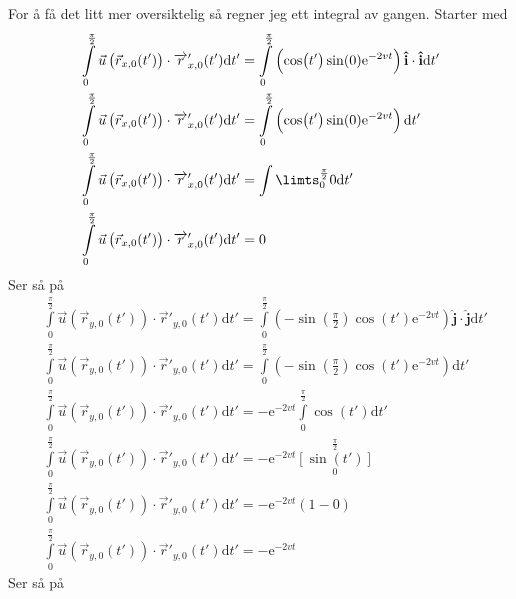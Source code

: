 \documentclass[a4paper,10pt,norsk]{article}
\newcommand{\dd}[1]{\mathrm{d}#1}
\newcommand{\uvec}[1]{\boldsymbol{\hat{\textbf{#1}}}}
\begin{document}
		For å få det litt mer oversiktelig så regner jeg ett integral av gangen. Starter med
		\begin{align*}
			&\int\limits_0^{\frac{\pi}{2}} \vec{u} \left( \vec{r}_{x,0}(t')  \right) \cdot \overrightarrow{r}'_{x,0}(t') \dd{t'} = 
			\int\limits_0^{\frac{\pi}{2}} \left( \cos(t')\sin(0) \mathrm{e}^{-2vt}  \right) \uvec{i}\cdot \uvec{i} \dd{t'}\\
			&\int\limits_0^{\frac{\pi}{2}} \vec{u} \left( \vec{r}_{x,0}(t')  \right) \cdot \overrightarrow{r}'_{x,0}(t') \dd{t'} = 
			\int\limits_0^{\frac{\pi}{2}} \left( \cos(t')\sin(0) \mathrm{e}^{-2vt}   \right) \dd{t'}\\
			&\int\limits_0^{\frac{\pi}{2}} \vec{u} \left( \vec{r}_{x,0}(t')  \right) \cdot \overrightarrow{r}'_{x,0}(t') \dd{t'} =
			\int\limts_0^{\frac{\pi}{2}} 0 \dd{t'}\\
			&\int\limits_0^{\frac{\pi}{2}} \vec{u} \left( \vec{r}_{x,0}(t')  \right) \cdot \overrightarrow{r}'_{x,0}(t') \dd{t'} = 0
		\end{align*}
		Ser så på
		\begin{align*}
			&\int\limits_0^{\frac{\pi}{2}} \vec{u} \left( \vec{r}_{y,0}(t')  \right) \cdot \overrightarrow{r}'_{y,0}(t') \dd{t'} =
			\int\limits_0^{\frac{\pi}{2}}\left( -\sin \left( \frac{\pi}{2} \right) \cos(t') \mathrm{e}^{-2vt}  \right)\uvec{j} \cdot \uvec{j}\dd{t'}\\
			&\int\limits_0^{\frac{\pi}{2}} \vec{u} \left( \vec{r}_{y,0}(t')  \right) \cdot \overrightarrow{r}'_{y,0}(t') \dd{t'} =
			\int\limits_0^{\frac{\pi}{2}}\left( -\sin \left( \frac{\pi}{2} \right) \cos(t') \mathrm{e}^{-2vt}  \right) \dd{t'}\\
			&\int\limits_0^{\frac{\pi}{2}} \vec{u} \left( \vec{r}_{y,0}(t')  \right) \cdot \overrightarrow{r}'_{y,0}(t') \dd{t'} =
			-\mathrm{e}^{-2vt} \int\limits_0^{\frac{\pi}{2}} \cos(t') \dd{t'}\\
			&\int\limits_0^{\frac{\pi}{2}} \vec{u} \left( \vec{r}_{y,0}(t')  \right) \cdot \overrightarrow{r}'_{y,0}(t') \dd{t'} =
			-\mathrm{e}^{-2vt} \left[ \sin(t') \right]\limits_0^{\frac{\pi}{2}}\\
			&\int\limits_0^{\frac{\pi}{2}} \vec{u} \left( \vec{r}_{y,0}(t')  \right) \cdot \overrightarrow{r}'_{y,0}(t') \dd{t'} = - \mathrm{e}^{-2vt} \left( 1 - 0 \right) \\
			&\int\limits_0^{\frac{\pi}{2}} \vec{u} \left( \vec{r}_{y,0}(t')  \right) \cdot \overrightarrow{r}'_{y,0}(t') \dd{t'} = - \mathrm{e}^{-2vt}
		\end{align*}
		Ser så på
\end{document}
